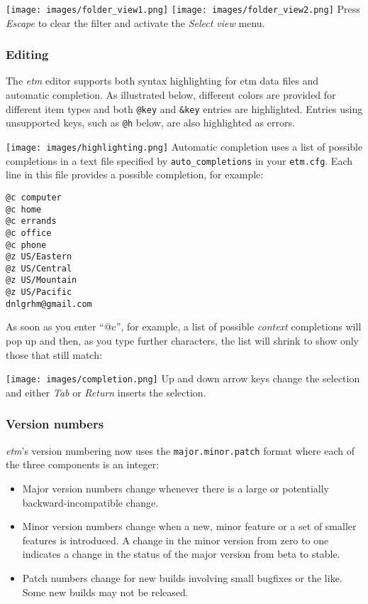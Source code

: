 \documentclass[]{article}
\makeatletter
\def\maxwidth{\ifdim\Gin@nat@width>\linewidth\linewidth
\else\Gin@nat@width\fi}
\let\Oldincludegraphics\includegraphics
\renewcommand{\includegraphics}[1]{\Oldincludegraphics[width=\maxwidth]{#1}}
\makeatother
\begin{document}
\texttt{[image: images/folder\_view1.png]}
\texttt{[image: images/folder\_view2.png]}
Press \emph{Escape} to clear the filter and activate the \emph{Select
view} menu.

\subsubsection{Editing}

The \emph{etm} editor supports both syntax highlighting for etm data
files and automatic completion. As illustrated below, different colors
are provided for different item types and both \texttt{@key} and
\texttt{\&key} entries are highlighted. Entries using unsupported keys,
such as \texttt{@h} below, are also highlighted as errors.

\texttt{[image: images/highlighting.png]}
Automatic completion uses a list of possible completions in a text file
specified by \texttt{auto\_completions} in your \texttt{etm.cfg}. Each
line in this file provides a possible completion, for example:

\begin{verbatim}
@c computer
@c home
@c errands
@c office
@c phone
@z US/Eastern
@z US/Central
@z US/Mountain
@z US/Pacific
dnlgrhm@gmail.com
\end{verbatim}

As soon as you enter ``@c'', for example, a list of possible
\emph{context} completions will pop up and then, as you type further
characters, the list will shrink to show only those that still match:

\texttt{[image: images/completion.png]}
Up and down arrow keys change the selection and either \emph{Tab} or
\emph{Return} inserts the selection.

\subsubsection{Version numbers}

\emph{etm}'s version numbering now uses the \texttt{major.minor.patch}
format where each of the three components is an integer:

\begin{itemize}
\item
  Major version numbers change whenever there is a large or potentially
  backward-incompatible change.
\item
  Minor version numbers change when a new, minor feature or a set of
  smaller features is introduced. A change in the minor version from
  zero to one indicates a change in the status of the major version from
  beta to stable.
\item
  Patch numbers change for new builds involving small bugfixes or the
  like. Some new builds may not be released.
\end{itemize}
\end{document}
